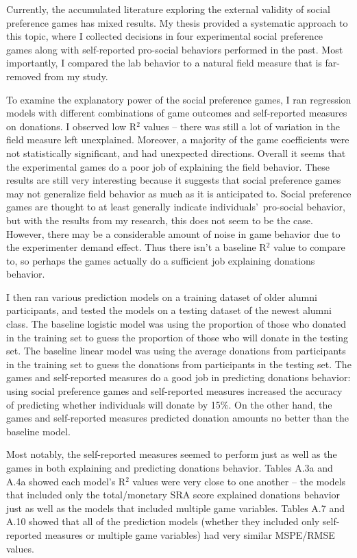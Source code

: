 \documentclass[12pt]{article}
\begin{document}
Currently, the accumulated literature exploring the external validity of social preference games has mixed results. My thesis provided a systematic approach to this topic, where I collected decisions in four experimental social preference games along with self-reported pro-social behaviors performed in the past. Most importantly, I compared the lab behavior to a natural field measure that is far-removed from my study.

To examine the explanatory power of the social preference games, I ran regression models with different combinations of game outcomes and self-reported measures on donations. I observed low R$^{2}$ values -- there was still a lot of variation in the field measure left unexplained. Moreover, a majority of the game coefficients were not statistically significant, and had unexpected directions. Overall it seems that the experimental games do a poor job of explaining the field behavior. These results are still very interesting because it suggests that social preference games may not generalize field behavior as much as it is anticipated to. Social preference games are thought to at least generally indicate individuals\rq \ pro-social behavior, but with the results from my research, this does not seem to be the case. However, there may be a considerable amount of noise in game behavior due to the experimenter demand effect. Thus there isn\rq t a baseline R$^{2}$ value to compare to, so perhaps the games actually do a sufficient job explaining donations behavior.

I then ran various prediction models on a training dataset of older alumni participants, and tested the models on a testing dataset of the newest alumni class. The baseline logistic model was using the proportion of those who donated in the training set to guess the proportion of those who will donate in the testing set. The baseline linear model was using the average donations from participants in the training set to guess the donations from participants in the testing set. The games and self-reported measures do a good job in predicting donations behavior:  using social preference games and self-reported measures increased the accuracy of predicting whether individuals will donate by 15\%. On the other hand, the games and self-reported measures predicted donation amounts no better than the baseline model.

Most notably, the self-reported measures seemed to perform just as well as the games in both explaining and predicting donations behavior. Tables A.3a and A.4a showed each model\rq s R$^{2}$ values were very close to one another -- the models that included only the total/monetary SRA score explained donations behavior just as well as the models that included multiple game variables. Tables A.7 and A.10 showed that all of the prediction models (whether they included only self-reported measures or multiple game variables) had very similar MSPE/RMSE values.
\end{document}
